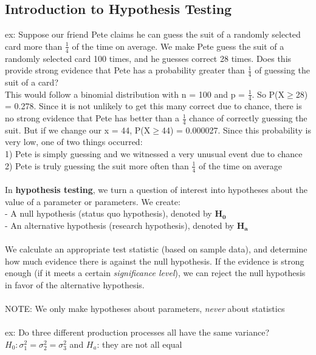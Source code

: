 \documentclass[12pt, a4paper]{article}
\begin{document}
	\subsection{Introduction to Hypothesis Testing}
	ex: Suppose our friend Pete claims he can guess the suit of a randomly selected card more than $\frac{1}{4}$ of the time on average. We make Pete guess the suit of a randomly selected card 100 times, and he guesses correct 28 times. Does this provide strong evidence that Pete has a probability greater than $\frac{1}{4}$ of guessing the suit of a card? \\
	This would follow a binomial distribution with n = 100 and p = $\frac{1}{4}$. So P(X$\geq$28) = 0.278. Since it is not unlikely to get this many correct due to chance, there is no strong evidence that Pete has better than a $\frac{1}{4}$ chance of correctly guessing the suit. But if we change our x = 44, P(X$\geq$44) = 0.000027. Since this probability is very low, one of two things occurred: \\
	1) Pete is simply guessing and we witnessed a very unusual event due to chance \\
	2) Pete is truly guessing the suit more often than $\frac{1}{4}$ of the time on average \\~\\
	In \textbf{hypothesis testing}, we turn a question of interest into hypotheses about the value of a parameter or parameters. We create: \\
	- A null hypothesis (status quo hypothesis), denoted by $\mathbf{H_0}$ \\
	- An alternative hypothesis (research hypothesis), denoted by $\mathbf{H_a}$ \\~\\
	We calculate an appropriate test statistic (based on sample data), and determine how much evidence there is against the null hypothesis. If the evidence is strong enough (if it meets a certain \textit{significance level}), we can reject the null hypothesis in favor of the alternative hypothesis. \\~\\
	NOTE: We only make hypotheses about parameters, \textit{never} about statistics \\~\\
	ex: Do three different production processes all have the same variance? \\
	$H_0: \sigma_1^2 = \sigma_2^2 = \sigma_3^2$ and $H_a$: they are not all equal \\~\\
	
\end{document}

